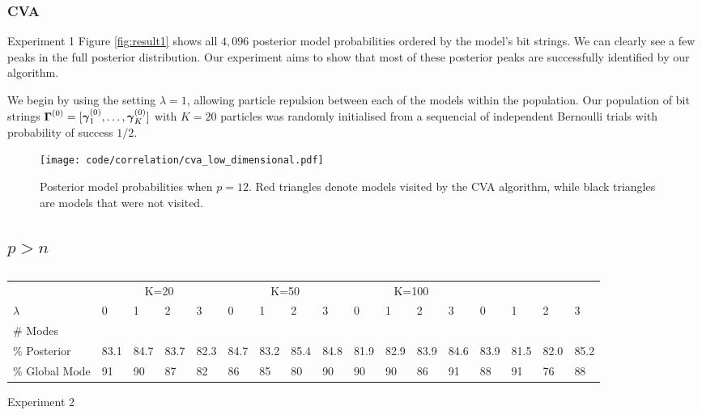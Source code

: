 \documentclass{amsart}[12pt]
\begin{document}
\subsubsection{CVA}

Experiment 1
Figure \ref{fig:result1} shows all $4,096$ posterior model probabilities ordered by the model's bit
strings. We can clearly see a few peaks in the full posterior distribution. Our experiment aims to show that
most of these posterior peaks are successfully identified by our algorithm.

We begin by using the setting $\lambda = 1$, allowing particle repulsion between each of the models within the
population. Our population of bit strings ${\boldsymbol \Gamma}^{(0)} = [{\boldsymbol \gamma}_1^{(0)}, \ldots, {\boldsymbol \gamma}_K^{(0)}]$ with
$K = 20$ particles was randomly initialised from a sequencial of independent Bernoulli trials with probability
of success $1/2$.

\begin{figure}	
	\caption{Posterior model probabilities when $p = 12$. Red triangles denote models visited by the CVA
						algorithm, while black triangles are models that were not visited.}
	\label{fig:cva_posterior_models}
	\texttt{[image: code/correlation/cva\_low\_dimensional.pdf]}
\end{figure}

\subsection{$p > n$}

\begin{table}
	\caption{}
	\label{tab:result2}
	\begin{tabular}{l|llll|llll|llll|llll}
	\hline
	 					& \multicolumn{4}{c}{K=20} 	& \multicolumn{4}{c}{K=50} & \multicolumn{4}{c}{K=100} \\
	$\lambda$ & 0 & 1 & 2 & 3 & 0 & 1 & 2 & 3 & 0 & 1 & 2 & 3 & 0 & 1 & 2 & 3 \\
	\hline
	\# Modes & \\
	\% Posterior & 83.1 & 84.7 & 83.7 & 82.3 & 84.7 & 83.2 & 85.4 & 84.8 & 81.9 & 82.9 & 83.9 & 84.6 & 83.9 & 81.5 & 82.0 & 85.2 \\
	\% Global Mode & 91 & 90 & 87 & 82 & 86 & 85 & 80 & 90 & 90 & 90 & 86 & 91 & 88 & 91 & 76 & 88 \\
	\hline
	\end{tabular}

\end{table}

Experiment 2
\end{document}
